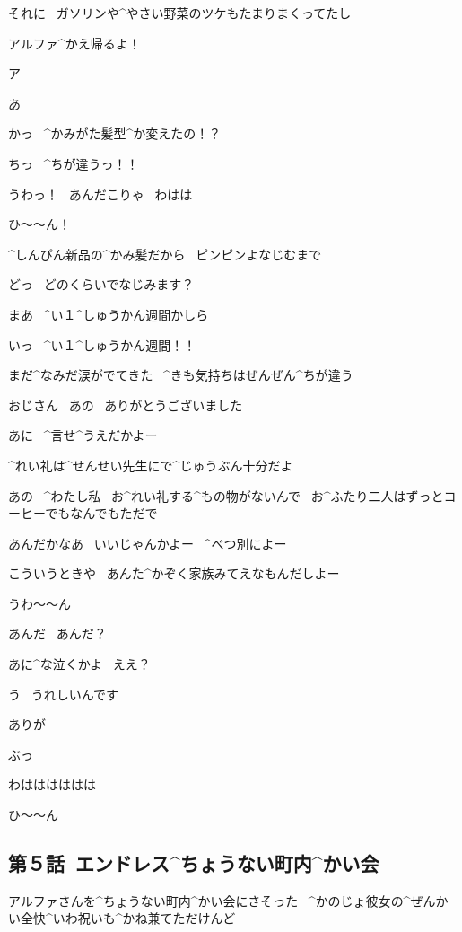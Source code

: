 \Sensei それに
\ ガソリンや^{やさい}{野菜}のツケもたまりまくってたし

\Takahiro アルファ^{かえ}{帰}るよ！

\page
\Takahiro ア

\Alpha あ

\Takahiro かっ
\ ^{かみがた}{髪型}^{か}{変}えたの！？

\Alpha ちっ
\ ^{ちが}{違}うっ！！

\Ojisan うわっ！
\ あんだこりゃ
\ わはは

\Alpha ひ〜〜ん！

\Sensei ^{しんぴん}{新品}の^{かみ}{髪}だから
\ ピンピンよなじむまで

\Alpha どっ
\ どのくらいでなじみます？

\page
\Sensei まあ
\ ^{い}{１}^{しゅうかん}{週間}かしら

\Alpha いっ
\ ^{い}{１}^{しゅうかん}{週間}！！

\Alpha まだ^{なみだ}{涙}がでてきた
\ ^{きも}{気持}ちはぜんぜん^{ちが}{違}う

\page
\Alpha おじさん
\ あの
\ ありがとうございました

\Ojisan あに
\ ^{言}{せ}^{う}{え}だかよー

\Ojisan ^{れい}{礼}は^{せんせい}{先生}にで^{じゅうぶん}{十分}だよ

\Alpha あの
\ ^{わたし}{私}
\ お^{れい}{礼}する^{もの}{物}がないんで
\ お^{ふたり}{二人}はずっとコーヒーでもなんでもただで

\Ojisan あんだかなあ
\ いいじゃんかよー
\ ^{べつ}{別}によー

\Ojisan こういうときや
\ あんた^{かぞく}{家族}みてえなもんだしよー

\page
\Alpha うわ〜〜ん

\Ojisan あんだ
\ あんだ？

\Ojisan あに^{な}{泣}くかよ
\ ええ？

\Alpha う
\ うれしいんです

\Alpha ありが

\Takahiro ぶっ

\page
\Takahiro わはははははは

\Alpha ひ〜〜ん


\subsection{第５話\ エンドレス^{ちょうない}{町内}^{かい}{会}}

\page[102]
\Narrator アルファさんを^{ちょうない}{町内}^{かい}{会}にさそった
\ ^{かのじょ}{彼女}の^{ぜんかい}{全快}^{いわ}{祝}いも^{かね}{兼}てただけんど

